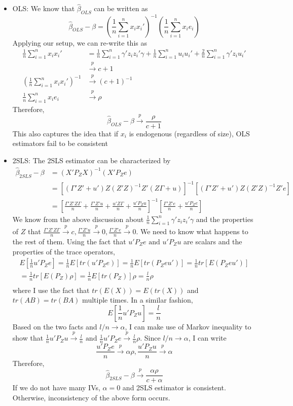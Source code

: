 \begin{itemize}
\item OLS: We know that $\hat{\beta}_{OLS}$ can be written as
\[
\hat{\beta}_{OLS}-\beta=\left(\frac{1}{n}\sum_{i=1}^n x_ix_i'\right)^{-1}\left(\frac{1}{n}\sum_{i=1}^n x_ie_i\right)
\]
Applying our setup, we can re-write this as
\[
\begin{aligned}
\frac{1}{n}\sum_{i=1}^n x_ix_i'&=\frac{1}{n}\sum_{i=1}^n \gamma'z_iz_i'\gamma+\frac{1}{n}\sum_{i=1}^n u_iu_i'+\frac{2}{n}\sum_{i=1}^n \gamma'z_iu_i'\\
&\xrightarrow{p} c+1\\
\left(\frac{1}{n}\sum_{i=1}^n x_ix_i'\right)^{-1}&\xrightarrow{p} (c+1)^{-1}\\
\frac{1}{n}\sum_{i=1}^n x_ie_i&\xrightarrow{p}\rho
\end{aligned}
\]
Therefore, 
\[
\hat{\beta}_{OLS}-\beta\xrightarrow{p}\frac{\rho}{c+1}
\]
This also captures the idea that if $x_i$ is endogenous (regardless of size), OLS estimators fail to be consistent
\item 2SLS: The 2SLS estimator can be characterized by
\[
\begin{aligned}
\hat{\beta}_{2SLS}-\beta&=(X'P_ZX)^{-1}(X'P_Ze)\\
&=[(\Gamma'Z'+u')Z(Z'Z)^{-1}Z'(Z\Gamma+u)]^{-1}[(\Gamma'Z'+u')Z(Z'Z)^{-1}Z'e]\\
&=[\frac{\Gamma'Z'Z\Gamma}{n}+\frac{\Gamma'Z'u}{n}+\frac{u'Z\Gamma}{n}+\frac{u'P_Zu}{n}]^{-1}[\frac{\Gamma'Z'e}{n}+\frac{u'P_Ze}{n}]
\end{aligned}
\]
We know from the above discussion about $\frac{1}{n}\sum_{i=1}^n \gamma'z_iz_i'\gamma$ and the properties of $Z$ that  $\frac{\Gamma'Z'Z\Gamma}{n}\xrightarrow{p}c, \frac{\Gamma'Z'u}{n}\xrightarrow{p}0, \frac{\Gamma'Z'e}{n}\xrightarrow{p}0$. We need to know what happens to the rest of them. Using the fact that $u'P_Ze \text{ and }u'P_Zu$ are scalars and the properties of the trace operators, 
\begin{gather*}
E\left[\frac{1}{n}u'P_Ze\right]=\frac{1}{n}E[tr(u'P_Ze)]=\frac{1}{n}E[tr(P_Zeu')]=\frac{1}{n}tr[E(P_Zeu')]\\
=\frac{1}{n}tr[E(P_Z)\rho]=\frac{1}{n}E[tr(P_Z)]\rho=\frac{l}{n}\rho\\
\end{gather*}
where I use the fact that $tr(E(X))=E(tr(X))$ and $tr(AB)=tr(BA)$ multiple times. In a similar fashion, 
\[
E\left[\frac{1}{n}u'P_Zu\right] = \frac{l}{n}
\]
Based on the two facts and $l/n\to\alpha$, I can make use of Markov inequality to show that $\frac{1}{n}u'P_Zu\xrightarrow{p} \frac{l}{n}\text{ and }\frac{1}{n}u'P_Ze\xrightarrow{p}\frac{l}{n}\rho$. Since $l/n\to\alpha$, I can write
\[
\frac{u'P_Ze}{n}\xrightarrow{p} \alpha\rho, \frac{u'P_Zu}{n}\xrightarrow{p} \alpha
\]
Therefore, 
\[
\hat{\beta}_{2SLS}-\beta\xrightarrow{p}\frac{\alpha\rho}{c+\alpha}
\]
If we do not have many IVs, $\alpha=0$ and 2SLS estimator is consistent. Otherwise, inconsistency of the above form occurs. 
\end{itemize}
